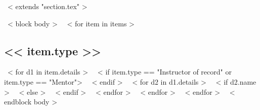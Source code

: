 ~< extends "section.tex" >~

~< block body >~
    ~< for item in items >~
	\subsection{<< item.type >>}
	~< for d1 in item.details >~
	~< if item.type == "Instructor of record" or item.type == "Mentor">~
	~< endif >~
		~< for d2 in d1.details >~
		~< if d2.name >~
		~< else >~
		~< endif >~
		~< endfor >~
	~< endfor >~
    ~< endfor >~
~< endblock body >~
